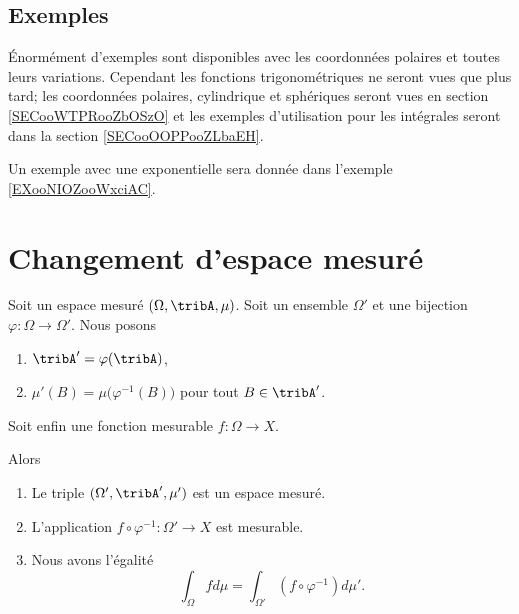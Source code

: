 \subsection{Exemples}

Énormément d'exemples sont disponibles avec les coordonnées polaires et toutes leurs variations. Cependant les fonctions trigonométriques ne seront vues que plus tard; les coordonnées polaires, cylindrique et sphériques seront vues en section \ref{SECooWTPRooZbOSzO} et les exemples d'utilisation pour les intégrales seront dans la section \ref{SECooOOPPooZLbaEH}.

Un exemple avec une exponentielle sera donnée dans l'exemple \ref{EXooNIOZooWxciAC}.


\section{Changement d'espace mesuré}

\begin{proposition}      \label{PROPooILOEooBiumKD}
	Soit un espace mesuré \( (\Omega,\tribA,\mu)\). Soit un ensemble \( \Omega'\) et une bijection \( \varphi\colon \Omega\to \Omega'\). Nous posons
	\begin{enumerate}
		\item
		      \( \tribA'=\varphi(\tribA)\),
		\item
		      \( \mu'(B)=\mu\big( \varphi^{-1}(B) \big)\) pour tout \( B\in\tribA'\).
	\end{enumerate}
	Soit enfin une fonction mesurable \( f\colon \Omega\to X\).

	Alors
	\begin{enumerate}
		\item
		      Le triple \( (\Omega',\tribA',\mu')\) est un espace mesuré.
		\item
		      L'application \( f\circ\varphi^{-1}\colon \Omega'\to X\) est mesurable.
		\item
		      Nous avons l'égalité
		      \begin{equation}
			      \int_{\Omega}fd\mu=\int_{\Omega'}(f\circ\varphi^{-1})d\mu'.
		      \end{equation}
	\end{enumerate}
\end{proposition}

